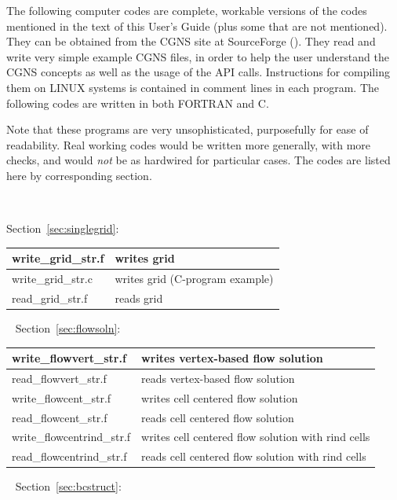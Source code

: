 \documentclass[12pt]{article}
\begin{document}
The following computer codes are complete, workable versions of the codes
mentioned in the text of this User's Guide (plus some that are
not mentioned).  They can be obtained from the CGNS site at SourceForge
().
They read and write very simple example CGNS files, in order to help
the user understand the CGNS concepts as well as the usage of the API calls.
Instructions for compiling them on LINUX systems is contained in comment
lines in each program. 
The following codes are written in both
FORTRAN and C.

Note that these programs are very unsophisticated, purposefully
for ease of readability.  Real working codes would be written more
generally, with more checks, and would {\it not} be as hardwired for
particular cases. The codes are listed here by corresponding section.

~\newline
{}

\noindent Section~\ref{sec:singlegrid}:

\begin{tabular}{ | l | l | }
\hline
write\_grid\_str.f         & writes grid \\ \hline
write\_grid\_str.c         & writes grid (C-program example) \\ \hline
read\_grid\_str.f          & reads grid \\ \hline
\end{tabular}

~\newline
Section~\ref{sec:flowsoln}:

\begin{tabular}{ | l | l | }
\hline
write\_flowvert\_str.f     & writes vertex-based flow solution \\ \hline
read\_flowvert\_str.f      & reads vertex-based flow solution \\ \hline
write\_flowcent\_str.f     & writes cell centered flow solution \\ \hline
read\_flowcent\_str.f      & reads cell centered flow solution \\ \hline
write\_flowcentrind\_str.f & writes cell centered flow solution with rind cells \\ \hline
read\_flowcentrind\_str.f  & reads cell centered flow solution with rind cells \\ \hline
\end{tabular}

~\newline
Section~\ref{sec:bcstruct}:
\end{document}
